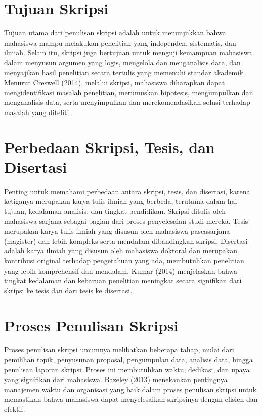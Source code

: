 \documentclass[
  indonesian,
  letterpaper,
]{scrbook}
\begin{document}
\section{Tujuan Skripsi}\label{tujuan-skripsi}

Tujuan utama dari penulisan skripsi adalah untuk menunjukkan bahwa
mahasiswa mampu melakukan penelitian yang independen, sistematis, dan
ilmiah. Selain itu, skripsi juga bertujuan untuk menguji kemampuan
mahasiswa dalam menyusun argumen yang logis, mengelola dan menganalisis
data, dan menyajikan hasil penelitian secara tertulis yang memenuhi
standar akademik. Menurut Creswell (2014), melalui skripsi, mahasiswa
diharapkan dapat mengidentifikasi masalah penelitian, merumuskan
hipotesis, mengumpulkan dan menganalisis data, serta menyimpulkan dan
merekomendasikan solusi terhadap masalah yang diteliti.

\section{Perbedaan Skripsi, Tesis, dan
Disertasi}\label{perbedaan-skripsi-tesis-dan-disertasi}

Penting untuk memahami perbedaan antara skripsi, tesis, dan disertasi,
karena ketiganya merupakan karya tulis ilmiah yang berbeda, terutama
dalam hal tujuan, kedalaman analisis, dan tingkat pendidikan. Skripsi
ditulis oleh mahasiswa sarjana sebagai bagian dari proses penyelesaian
studi mereka. Tesis merupakan karya tulis ilmiah yang disusun oleh
mahasiswa pascasarjana (magister) dan lebih kompleks serta mendalam
dibandingkan skripsi. Disertasi adalah karya ilmiah yang disusun oleh
mahasiswa doktoral dan merupakan kontribusi original terhadap
pengetahuan yang ada, membutuhkan penelitian yang lebih komprehensif dan
mendalam. Kumar (2014) menjelaskan bahwa tingkat kedalaman dan kebaruan
penelitian meningkat secara signifikan dari skripsi ke tesis dan dari
tesis ke disertasi.

\section{Proses Penulisan Skripsi}\label{proses-penulisan-skripsi}

Proses penulisan skripsi umumnya melibatkan beberapa tahap, mulai dari
pemilihan topik, penyusunan proposal, pengumpulan data, analisis data,
hingga penulisan laporan skripsi. Proses ini membutuhkan waktu,
dedikasi, dan upaya yang signifikan dari mahasiswa. Bazeley (2013)
menekankan pentingnya manajemen waktu dan organisasi yang baik dalam
proses penulisan skripsi untuk memastikan bahwa mahasiswa dapat
menyelesaikan skripsinya dengan efisien dan efektif.
\end{document}
